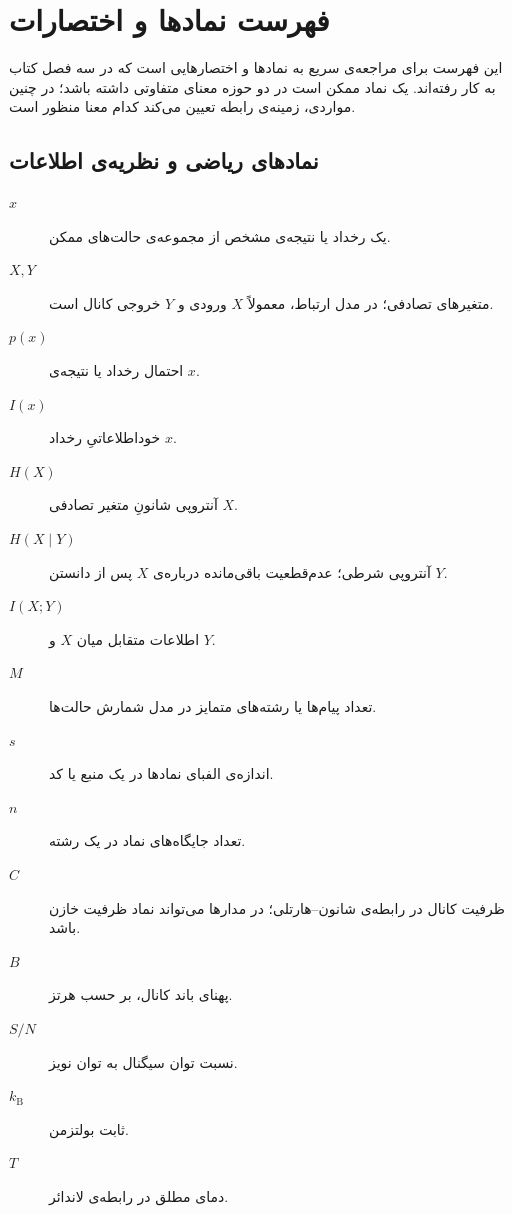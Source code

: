 \chapter*{فهرست نمادها و اختصارات}

این فهرست برای مراجعه‌ی سریع به نمادها و اختصارهایی است که در سه فصل
کتاب به کار رفته‌اند. یک نماد ممکن است در دو حوزه معنای متفاوتی داشته
باشد؛ در چنین مواردی، زمینه‌ی رابطه تعیین می‌کند کدام معنا منظور است.

\section*{نمادهای ریاضی و نظریه‌ی اطلاعات}
\begin{description}
  \item[\(x\)] یک رخداد یا نتیجه‌ی مشخص از مجموعه‌ی حالت‌های ممکن.
  \item[\(X,Y\)] متغیرهای تصادفی؛ در مدل ارتباط، معمولاً \(X\) ورودی و \(Y\) خروجی کانال است.
  \item[\(p(x)\)] احتمال رخداد یا نتیجه‌ی \(x\).
  \item[\(I(x)\)] خوداطلاعاتیِ رخداد \(x\).
  \item[\(H(X)\)] آنتروپی شانونِ متغیر تصادفی \(X\).
  \item[\(H(X\mid Y)\)] آنتروپی شرطی؛ عدم‌قطعیت باقی‌مانده درباره‌ی \(X\) پس از دانستن \(Y\).
  \item[\(I(X;Y)\)] اطلاعات متقابل میان \(X\) و \(Y\).
  \item[\(M\)] تعداد پیام‌ها یا رشته‌های متمایز در مدل شمارش حالت‌ها.
  \item[\(s\)] اندازه‌ی الفبای نمادها در یک منبع یا کد.
  \item[\(n\)] تعداد جایگاه‌های نماد در یک رشته.
  \item[\(C\)] ظرفیت کانال در رابطه‌ی شانون--هارتلی؛ در مدارها می‌تواند نماد ظرفیت خازن باشد.
  \item[\(B\)] پهنای باند کانال، بر حسب هرتز.
  \item[\(S/N\)] نسبت توان سیگنال به توان نویز.
  \item[\(k_{\mathrm B}\)] ثابت بولتزمن.
  \item[\(T\)] دمای مطلق در رابطه‌ی لاندائر.
\end{description}

